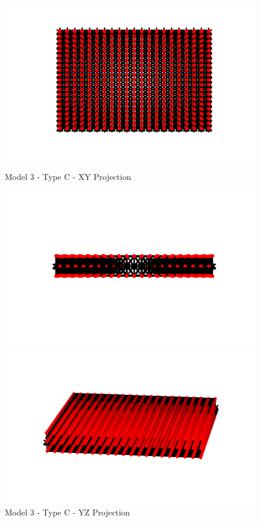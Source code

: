 \begin{figure}[!htbp]
\begin{minipage}{0.3\textwidth}
    \centering
    \includegraphics[width = 1\textwidth]{Figures/M3_type_c_XY.png}
    \caption{Model 3 - Type C - XY Projection}
    \label{fig:M3_c_XY}
\end{minipage}
\hspace{5mm}
\begin{minipage}{0.3\textwidth}
    \centering
    \includegraphics[width = 1\textwidth]{Figures/M3_type_c_YZ.png}
    \caption{Model 3 - Type C - YZ Projection}
    \label{fig:M3_c_YZ}
\end{minipage}
\hspace{5mm}
\begin{minipage}{0.3\textwidth}
    \centering
    \includegraphics[width = 1\textwidth]{Figures/M3_type_c_3D.png}

\end{minipage}
\end{figure}
